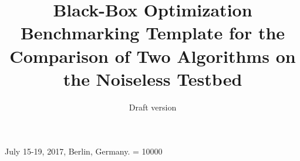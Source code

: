 \documentclass{sig-alternate}
\begin{document}
%
 {July 15-19, 2017, Berlin, Germany.}
\widowpenalty = 10000

\title{Black-Box Optimization Benchmarking Template for the Comparison of Two Algorithms on the Noiseless Testbed}
\subtitle{Draft version
}

%
%
%
%
%
\end{document}
